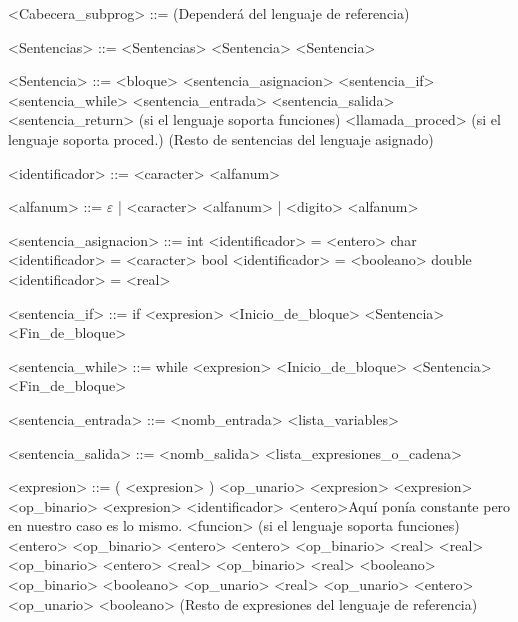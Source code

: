 \documentclass{scrartcl}
\begin{document}
\begin{grammar}
<Cabecera_subprog> ::= (Dependerá del lenguaje de referencia)

<Sentencias> ::= <Sentencias> <Sentencia>
\alt <Sentencia>

<Sentencia> ::= <bloque>
\alt <sentencia_asignacion>
\alt <sentencia_if>
\alt <sentencia_while>
\alt <sentencia_entrada>
\alt <sentencia_salida>
\alt <sentencia_return> (si el lenguaje soporta funciones)
\alt <llamada_proced> (si el lenguaje soporta proced.)
\alt (Resto de sentencias del lenguaje asignado)

<identificador> ::= <caracter> <alfanum>

<alfanum> ::= $\varepsilon$ | <caracter> <alfanum> | <digito> <alfanum>

<sentencia_asignacion> ::=  int <identificador> = <entero>
\alt char <identificador> = <caracter>
\alt bool <identificador> = <booleano>
\alt double <identificador> = <real>

<sentencia_if> ::= if <expresion> <Inicio_de_bloque>
 <Sentencia>
 <Fin_de_bloque>

<sentencia_while> ::= while <expresion> <Inicio_de_bloque>
<Sentencia>
<Fin_de_bloque>

<sentencia_entrada> ::= <nomb_entrada> <lista_variables>

<sentencia_salida> ::= <nomb_salida> <lista_expresiones_o_cadena>

<expresion> ::= ( <expresion> )
\alt <op_unario> <expresion>
\alt <expresion> <op_binario> <expresion>
\alt <identificador>
\alt <entero>Aquí ponía constante pero en nuestro caso es lo mismo.
\alt <funcion> (si el lenguaje soporta funciones)
\alt <entero> <op_binario> <entero>
\alt <entero> <op_binario> <real>
\alt <real> <op_binario> <entero>
\alt <real> <op_binario> <real>
\alt <booleano> <op_binario> <booleano>
\alt <op_unario> <real>
\alt <op_unario> <entero>
\alt <op_unario> <booleano>
\alt (Resto de expresiones del lenguaje de referencia)


\end{grammar}
\end{document}
